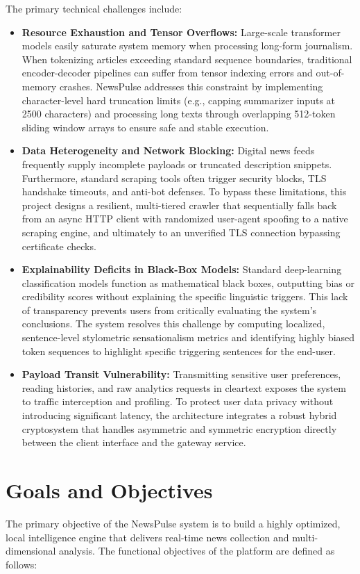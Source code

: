 The primary technical challenges include:
\begin{itemize}
    \item \textbf{Resource Exhaustion and Tensor Overflows:} Large-scale transformer models easily saturate system memory when processing long-form journalism. When tokenizing articles exceeding standard sequence boundaries, traditional encoder-decoder pipelines can suffer from tensor indexing errors and out-of-memory crashes. NewsPulse addresses this constraint by implementing character-level hard truncation limits (e.g., capping summarizer inputs at 2500 characters) and processing long texts through overlapping 512-token sliding window arrays to ensure safe and stable execution.
    \item \textbf{Data Heterogeneity and Network Blocking:} Digital news feeds frequently supply incomplete payloads or truncated description snippets. Furthermore, standard scraping tools often trigger security blocks, TLS handshake timeouts, and anti-bot defenses. To bypass these limitations, this project designs a resilient, multi-tiered crawler that sequentially falls back from an async HTTP client with randomized user-agent spoofing to a native scraping engine, and ultimately to an unverified TLS connection bypassing certificate checks.
    \item \textbf{Explainability Deficits in Black-Box Models:} Standard deep-learning classification models function as mathematical black boxes, outputting bias or credibility scores without explaining the specific linguistic triggers. This lack of transparency prevents users from critically evaluating the system's conclusions. The system resolves this challenge by computing localized, sentence-level stylometric sensationalism metrics and identifying highly biased token sequences to highlight specific triggering sentences for the end-user.
    \item \textbf{Payload Transit Vulnerability:} Transmitting sensitive user preferences, reading histories, and raw analytics requests in cleartext exposes the system to traffic interception and profiling. To protect user data privacy without introducing significant latency, the architecture integrates a robust hybrid cryptosystem that handles asymmetric and symmetric encryption directly between the client interface and the gateway service.
\end{itemize}

\section{Goals and Objectives}
The primary objective of the NewsPulse system is to build a highly optimized, local intelligence engine that delivers real-time news collection and multi-dimensional analysis. The functional objectives of the platform are defined as follows:

